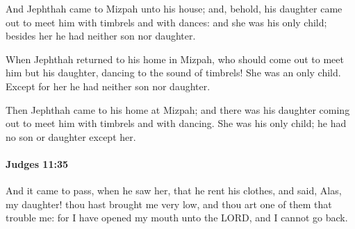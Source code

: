 			\begin{versebox}
					\item[BHS] 
					\item[ASV] And Jephthah came to Mizpah unto his house; and, behold, his daughter came out to meet him with timbrels and with dances: and she was his only child; besides her he had neither son nor daughter.
					\item[NIV] When Jephthah returned to his home in Mizpah, who should come out to meet him but his daughter, dancing to the sound of timbrels! She was an only child. Except for her he had neither son nor daughter.
					\item[NRSV] Then Jephthah came to his home at Mizpah; and there was his daughter coming out to meet him with timbrels and with dancing. She was his only child; he had no son or daughter except her.
			\end{versebox}

		\paragraph{Judges 11:35} %
			\label{JUDGES-11-35}

			And it came to pass, when he saw her, that he rent his clothes, and said, Alas, my daughter! thou hast brought me very low, and thou art one of them that trouble me: for I have opened my mouth unto the LORD, and I cannot go back.

